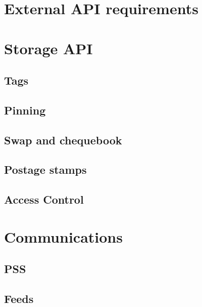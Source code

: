 \section{External API requirements\statusorange}\label{spec:api:external}



\section{Storage API \statusyellow}\label{spec:api:storage}



\subsection{Tags \statusyellow}\label{spec:api:tags}


\subsection{Pinning
\statusyellow}\label{spec:api:pinning}


\subsection{Swap and chequebook\statusorange}\label{spec:api:swap}


\subsection{Postage stamps \statusorange}\label{spec:api:postage}



\subsection{Access Control  \statusgreen}\label{spec:api:access-control}




\section{Communications  \statusorange}\label{spec:api:communications}


\subsection{PSS \statusyellow}\label{spec:api:trojan}



\subsection{Feeds \statusorange}\label{spec:api:feeds}





